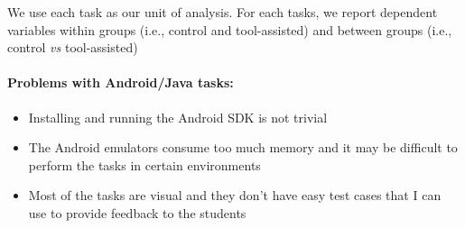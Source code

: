 {We use each task as our unit of analysis. For each tasks, we report dependent variables within groups (i.e., control and tool-assisted) and between groups (i.e., control \textit{vs} tool-assisted)



\clearpage



\smallskip
\paragraph{\textbf{Problems with Android/Java tasks:}}

\begin{itemize}
    \item Installing and running the Android SDK is not trivial
    \item The Android emulators consume too much memory and it may be difficult to perform the tasks in certain environments
    \item Most of the tasks are visual and they don't have easy test cases that I can use to provide feedback to the students
\end{itemize}










}
